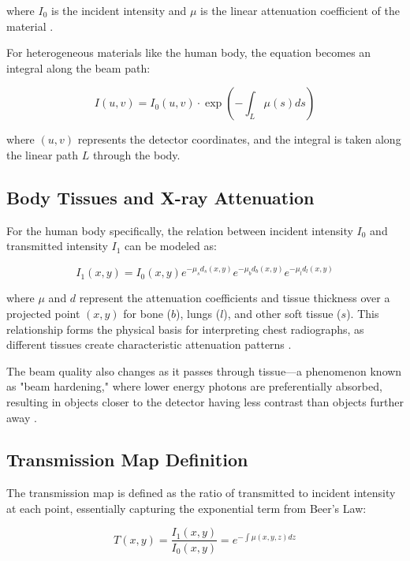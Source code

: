 \documentclass[nomenclature, english, bibtex]{kththesis}
\numberwithin{listing}{chapter}
\begin{document}
where $I_0$ is the incident intensity and $\mu$ is the linear attenuation coefficient of the material \cite[p.~35]{cullity2014elements}.

For heterogeneous materials like the human body, the equation becomes an integral along the beam path:

\begin{equation}
I(u,v) = I_0(u,v) \cdot \exp\left(-\int_L \mu(s)ds\right)
\end{equation}

where $(u,v)$ represents the detector coordinates, and the integral is taken along the linear path $L$ through the body.

\subsection{Body Tissues and X-ray Attenuation}
For the human body specifically, the relation between incident intensity $I_0$ and transmitted intensity $I_1$ can be modeled as:

\begin{equation}
I_1(x, y) = I_0(x, y) e^{-\mu_s d_s(x,y)} e^{-\mu_b d_b(x,y)} e^{-\mu_l d_l(x, y)}
\end{equation}

where $\mu$ and $d$ represent the attenuation coefficients and tissue thickness over a projected point $(x,y)$ for bone ($b$), lungs ($l$), and other soft tissue ($s$). This relationship forms the physical basis for interpreting chest radiographs, as different tissues create characteristic attenuation patterns \cite{prokop2003principles}.

The beam quality also changes as it passes through tissue—a phenomenon known as "beam hardening," where lower energy photons are preferentially absorbed, resulting in objects closer to the detector having less contrast than objects further away \cite{bushberg2011essential}.

\subsection{Transmission Map Definition}
The transmission map is defined as the ratio of transmitted to incident intensity at each point, essentially capturing the exponential term from Beer's Law:

\begin{equation}
T(x,y) = \frac{I_1(x,y)}{I_0(x,y)} = e^{-\int \mu(x,y,z) dz}
\end{equation}
\end{document}
